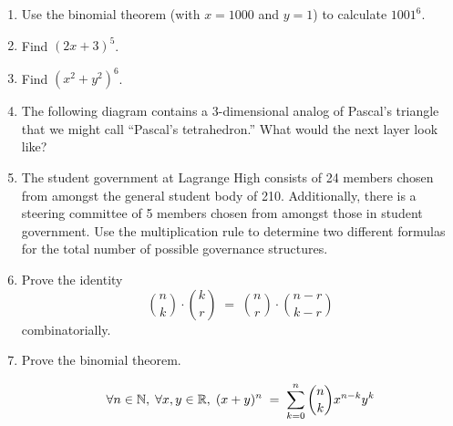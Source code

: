 \begin{enumerate}

\item Use the binomial theorem (with $x=1000$ and $y=1$) to calculate
$1001^6$.

\wbvfill

\item Find $(2x+3)^5$.

\wbvfill

\item Find $(x^2+y^2)^6$.

\wbvfill

\workbookpagebreak

\item The following diagram contains a 3-dimensional analog of
Pascal's triangle that we might call ``Pascal's tetrahedron.'' 
What would the next layer look like?

\begin{center}

\end{center}

\wbvfill

\item The student government at Lagrange High consists of 24 members chosen
from amongst the general student body of 210. Additionally, there
is a steering committee of 5 members chosen from amongst those in
student government. Use the multiplication rule to determine two different
formulas for the total number of possible governance structures.

\wbvfill

\workbookpagebreak

\item Prove the identity
\[ \binom{n}{k} \cdot \binom{k}{r} \; = \; \binom{n}{r} \cdot \binom{n-r}{k-r} \]
combinatorially.

\wbvfill

\item Prove the binomial theorem.

\[ \forall n \in {\mathbb N}, \; \forall x,y \in {\mathbb R}, \; 
(x+y)^n \; = \; \sum_{k=0}^n \binom{n}{k} x^{n-k}y^k \]

\wbvfill

\workbookpagebreak

\end{enumerate}


